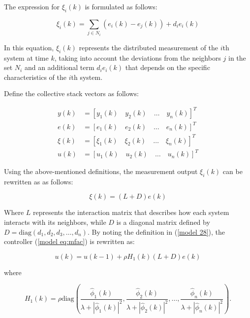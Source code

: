 \documentclass[journal,onecolumn]{IEEEtran}
\begin{document}
The expression for \(\xi_i(k)\) is formulated as follows:

\begin{equation}
    \label{model 27}
    \xi_i(k) = \sum_{j \in N_i} (e_i(k) - e_j(k)) + d_i e_i(k)
\end{equation}

In this equation, \(\xi_i(k)\) represents the distributed measurement of the $i$th system at time \(k\), taking into account the deviations from the neighbors \(j\) in the set \(N_i\) and an additional term \(d_i e_i(k)\) that depends on the specific characteristics of the $i$th system.

Define the collective stack vectors as follows:

    
\begin{align*}
    y(k)   &= \left[ y_1(k) \quad y_2(k) \quad \dots \quad y_n(k) \right]^T \\
    e(k)   &= \left[ e_1(k) \quad e_2(k) \quad \dots \quad e_n(k) \right]^T \\ 
    \xi(k) &= \left[ \xi_1(k) \quad \xi_2(k) \quad \dots \quad \xi_n(k) \right]^T \\
    u(k)   &= \left[ u_1(k) \quad u_2(k) \quad \dots \quad u_n(k) \right]^T
    \end{align*}
    

Using the above-mentioned definitions, the measurement output \(\xi_i(k)\) can be rewritten as as follows:

\begin{equation}
    \label{model 28}
    \xi(k) = (L + D) e(k)
\end{equation}

Where \(L\) represents the interaction matrix that describes how each system interacts with its neighbors, while \(D\) is a diagonal matrix defined by \(D = \text{diag}(d_1, d_2, d_3, \dots, d_n)\). By noting the definition in (\ref{model 28}), the controller (\ref{model eq:mfac}) is rewritten as:


\begin{equation}
    \label{model 29}
    u(k) = u(k-1) + \rho H_1(k) (L + D) e(k)
\end{equation}

where


\[
H_1(k) = \rho   \text{diag}\left(\frac{\hat{\phi}_1(k)}{\lambda + |\hat{\phi}_1(k)|^2}, \frac{\hat{\phi}_2(k)}{\lambda + |\hat{\phi}_2(k)|^2}, \dots, \frac{\hat{\phi}_n(k)}{\lambda + |\hat{\phi}_n(k)|^2}\right).
\]


\end{document}
